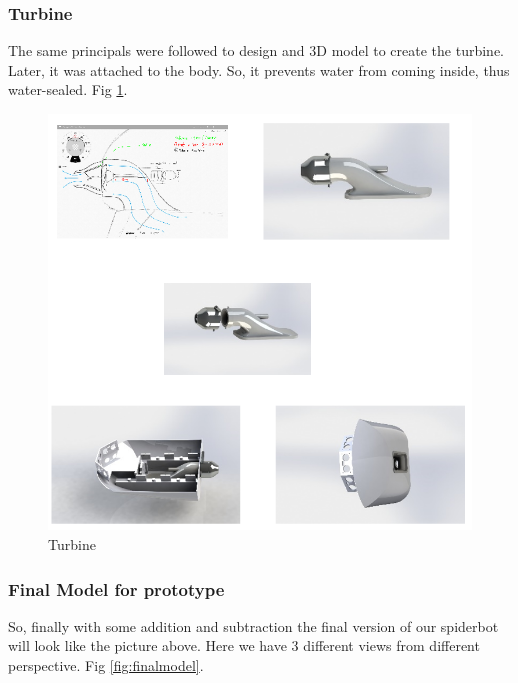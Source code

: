 \documentclass[10pt,journal,compsoc]{IEEEtran}
\begin{document}
\subsubsection{Turbine}

The same principals were followed to design and 3D model to create the turbine. Later, it was attached to the body. So, it prevents water from coming inside, thus water-sealed. Fig \ref{fig:turbine}.

\begin{figure}[h]
\includegraphics[scale=0.47]{turbine}
\caption{Turbine}
\label{fig:turbine}
\end{figure}

\subsubsection{Final Model for prototype}

So, finally with some addition and subtraction the final version of our spiderbot will look like the picture above. Here we have 3 different views from different perspective. Fig \ref{fig:finalmodel}.
\end{document}
